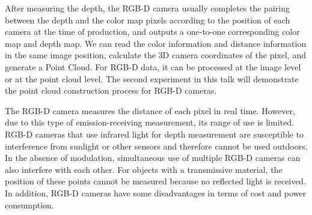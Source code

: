 After measuring the depth, the RGB-D camera usually completes the pairing between the depth and the color map pixels according to the position of each camera at the time of production, and outputs a one-to-one corresponding color map and depth map. We can read the color information and distance information in the same image position, calculate the 3D camera coordinates of the pixel, and generate a Point Cloud. For RGB-D data, it can be processed at the image level or at the point cloud level. The second experiment in this talk will demonstrate the point cloud construction process for RGB-D cameras.

The RGB-D camera measures the distance of each pixel in real time. However, due to this type of emission-receiving measurement, its range of use is limited. RGB-D cameras that use infrared light for depth measurement are susceptible to interference from sunlight or other sensors and therefore cannot be used outdoors. In the absence of modulation, simultaneous use of multiple RGB-D cameras can also interfere with each other. For objects with a transmissive material, the position of these points cannot be measured because no reflected light is received. In addition, RGB-D cameras have some disadvantages in terms of cost and power consumption.

